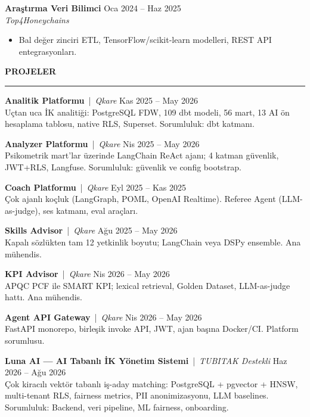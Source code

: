 \documentclass[11pt,a4paper]{article}
\newcommand{\cvsection}[1]{%
  \vspace{1.2em}%
  {\large\textbf{\MakeUppercase{#1}}}\\[0.2em]
  \hrule
  \vspace{0.6em}%
}
\newcommand{\jobentry}[4]{%
  \textbf{#1} \hfill {\small #2}\\
  \textit{#3} \hfill {\small #4}\\[0.2em]
}
\begin{document}
\jobentry{Araştırma Veri Bilimci}{Oca 2024 -- Haz 2025}{Top4Honeychains}{}
\begin{itemize}[leftmargin=1.5em, nosep, topsep=2pt, itemsep=2pt]
  \item Bal değer zinciri ETL, TensorFlow/scikit-learn modelleri, REST API entegrasyonları.
\end{itemize}

\cvsection{Projeler}

\textbf{Analitik Platformu} \,|\, \textit{Qkare} \hfill Kas 2025 -- May 2026\\
Uçtan uca İK analitiği: PostgreSQL FDW, 109 dbt modeli, 56 mart, 13 AI ön hesaplama tablosu, native RLS, Superset. Sorumluluk: dbt katmanı.
\vspace{0.5em}

\textbf{Analyzer Platformu} \,|\, \textit{Qkare} \hfill Nis 2025 -- May 2026\\
Psikometrik mart'lar üzerinde LangChain ReAct ajanı; 4 katman güvenlik, JWT+RLS, Langfuse. Sorumluluk: güvenlik ve config bootstrap.
\vspace{0.5em}

\textbf{Coach Platformu} \,|\, \textit{Qkare} \hfill Eyl 2025 -- Kas 2025\\
Çok ajanlı koçluk (LangGraph, POML, OpenAI Realtime). Referee Agent (LLM-as-judge), ses katmanı, eval araçları.
\vspace{0.5em}

\textbf{Skills Advisor} \,|\, \textit{Qkare} \hfill Ağu 2025 -- May 2026\\
Kapalı sözlükten tam 12 yetkinlik boyutu; LangChain veya DSPy ensemble. Ana mühendis.
\vspace{0.5em}

\textbf{KPI Advisor} \,|\, \textit{Qkare} \hfill Nis 2026 -- May 2026\\
APQC PCF ile SMART KPI; lexical retrieval, Golden Dataset, LLM-as-judge hattı. Ana mühendis.
\vspace{0.5em}

\textbf{Agent API Gateway} \,|\, \textit{Qkare} \hfill Nis 2026 -- May 2026\\
FastAPI monorepo, birleşik invoke API, JWT, ajan başına Docker/CI. Platform sorumlusu.
\vspace{0.5em}

\textbf{Luna AI — AI Tabanlı İK Yönetim Sistemi} \,|\, \textit{TUBITAK Destekli} \hfill Haz 2026 -- Ağu 2026\\
Çok kiracılı vektör tabanlı iş-aday matching: PostgreSQL + pgvector + HNSW, multi-tenant RLS, fairness metrics, PII anonimizasyonu, LLM baselines. Sorumluluk: Backend, veri pipeline, ML fairness, onboarding.
\vspace{0.5em}
\end{document}
